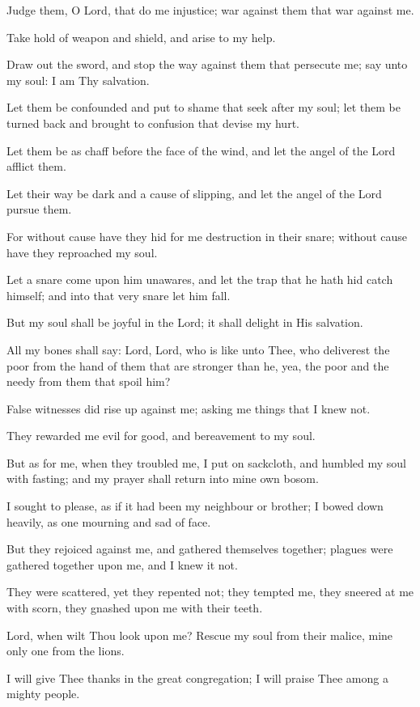 Judge them, O Lord, that do me injustice; war against them that war against me.

Take hold of weapon and shield, and arise to my help.

Draw out the sword, and stop the way against them that persecute me; say unto my soul: I am Thy salvation.

Let them be confounded and put to shame that seek after my soul; let them be turned back and brought to confusion that devise my hurt.

Let them be as chaff before the face of the wind, and let the angel of the Lord afflict them.

Let their way be dark and a cause of slipping, and let the angel of the Lord pursue them.

For without cause have they hid for me destruction in their snare; without cause have they reproached my soul.

Let a snare come upon him unawares, and let the trap that he hath hid catch himself; and into that very snare let him fall.

But my soul shall be joyful in the Lord; it shall delight in His salvation.

All my bones shall say: Lord, Lord, who is like unto Thee, who deliverest the poor from the hand of them that are stronger than he, yea, the poor and the needy from them that spoil him?

False witnesses did rise up against me; asking me things that I knew not.

They rewarded me evil for good, and bereavement to my soul.

But as for me, when they troubled me, I put on sackcloth, and humbled my soul with fasting; and my prayer shall return into mine own bosom.

I sought to please, as if it had been my neighbour or brother; I bowed down heavily, as one mourning and sad of face.

But they rejoiced against me, and gathered themselves together; plagues were gathered together upon me, and I knew it not.

They were scattered, yet they repented not; they tempted me, they sneered at me with scorn, they gnashed upon me with their teeth.

Lord, when wilt Thou look upon me? Rescue my soul from their malice, mine only one from the lions.

I will give Thee thanks in the great congregation; I will praise Thee among a mighty people.

